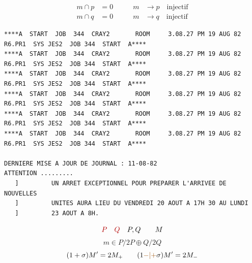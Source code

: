 \[
\begin{aligned}m\cap p&=0\\m\cap q&=0\end{aligned}
\qquad
\begin{aligned}m&\longrightarrow p\quad\text{injectif}\\m&\longrightarrow q\quad\text{injectif}\end{aligned}
\]
\begin{verbatim}
****A  START  JOB  344  CRAY2       ROOM     3.08.27 PM 19 AUG 82  R6.PR1  SYS JES2  JOB 344  START  A****
****A  START  JOB  344  CRAY2       ROOM     3.08.27 PM 19 AUG 82  R6.PR1  SYS JES2  JOB 344  START  A****
****A  START  JOB  344  CRAY2       ROOM     3.08.27 PM 19 AUG 82  R6.PR1  SYS JES2  JOB 344  START  A****
****A  START  JOB  344  CRAY2       ROOM     3.08.27 PM 19 AUG 82  R6.PR1  SYS JES2  JOB 344  START  A****
****A  START  JOB  344  CRAY2       ROOM     3.08.27 PM 19 AUG 82  R6.PR1  SYS JES2  JOB 344  START  A****
****A  START  JOB  344  CRAY2       ROOM     3.08.27 PM 19 AUG 82  R6.PR1  SYS JES2  JOB 344  START  A****

DERNIERE MISE A JOUR DE JOURNAL : 11-08-82
ATTENTION .........
   ]         UN ARRET EXCEPTIONNEL POUR PREPARER L'ARRIVEE DE NOUVELLES
   ]         UNITES AURA LIEU DU VENDREDI 20 AOUT A 17H 30 AU LUNDI
   ]         23 AOUT A 8H.
\end{verbatim}
\[
\deleted{P\quad Q}\quad P,Q\qquad M
\]
\[
m\in P/2P\oplus Q/2Q
\]
\[
(1+\sigma)M'=2M_+\qquad (1\unsure{-|+}\sigma)M'=2M_-
\]

